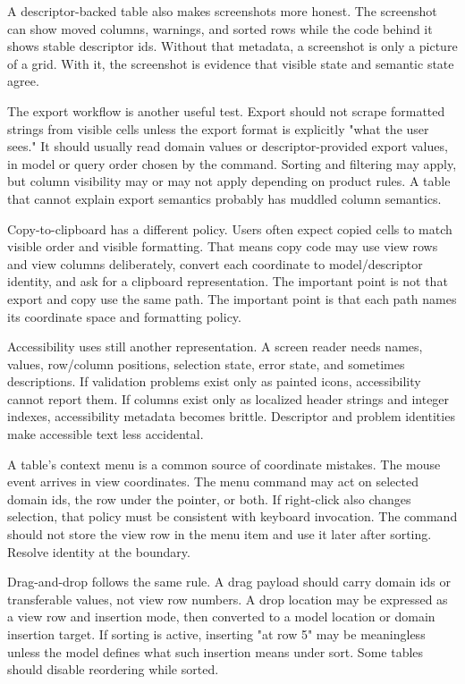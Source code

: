 A descriptor-backed table also makes screenshots more honest. The screenshot can show moved columns, warnings, and sorted rows while the code behind it shows stable descriptor ids. Without that metadata, a screenshot is only a picture of a grid. With it, the screenshot is evidence that visible state and semantic state agree.

The export workflow is another useful test. Export should not scrape formatted strings from visible cells unless the export format is explicitly "what the user sees." It should usually read domain values or descriptor-provided export values, in model or query order chosen by the command. Sorting and filtering may apply, but column visibility may or may not apply depending on product rules. A table that cannot explain export semantics probably has muddled column semantics.

Copy-to-clipboard has a different policy. Users often expect copied cells to match visible order and visible formatting. That means copy code may use view rows and view columns deliberately, convert each coordinate to model/descriptor identity, and ask for a clipboard representation. The important point is not that export and copy use the same path. The important point is that each path names its coordinate space and formatting policy.

Accessibility uses still another representation. A screen reader needs names, values, row/column positions, selection state, error state, and sometimes descriptions. If validation problems exist only as painted icons, accessibility cannot report them. If columns exist only as localized header strings and integer indexes, accessibility metadata becomes brittle. Descriptor and problem identities make accessible text less accidental.

A table's context menu is a common source of coordinate mistakes. The mouse event arrives in view coordinates. The menu command may act on selected domain ids, the row under the pointer, or both. If right-click also changes selection, that policy must be consistent with keyboard invocation. The command should not store the view row in the menu item and use it later after sorting. Resolve identity at the boundary.

Drag-and-drop follows the same rule. A drag payload should carry domain ids or transferable values, not view row numbers. A drop location may be expressed as a view row and insertion mode, then converted to a model location or domain insertion target. If sorting is active, inserting "at row 5" may be meaningless unless the model defines what such insertion means under sort. Some tables should disable reordering while sorted.

